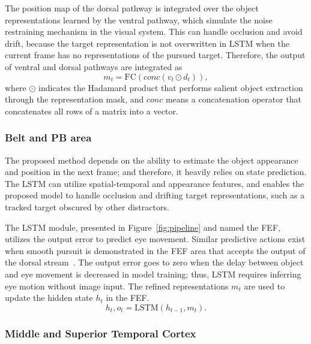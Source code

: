 \documentclass[journal]{IEEEtran}
\begin{document}
The position map of the dorsal pathway is integrated over the object representations learned by the ventral pathway, which simulate the noise restraining mechanism in the visual system. 
This can handle occlusion and avoid drift, because the target representation is not overwritten in LSTM when the current frame has no representations of the pursued target. 
Therefore, the output of ventral and dorsal pathways are integrated as
\begin{equation}
	m_t = \text{FC}(conc(v_t \odot d_t)),
\end{equation}
where $\odot$ indicates the Hadamard product that performs salient object extraction through the representation mask, 
and $conc$ means a concatenation operator that concatenates all rows of a matrix into a vector.

\subsubsection{Belt and PB area}

The proposed method depends on the ability to estimate the object appearance and position in the next frame; 
and therefore, it heavily relies on state prediction. 
The LSTM can utilize spatial-temporal and appearance features, 
and enables the proposed model to handle occlusion and drifting target representations, such as a tracked target obscured by other distractors. 

The LSTM module, presented in Figure~\ref{fig:pipeline} and named the FEF, utilizes the output error to predict eye movement. 
Similar predictive actions exist when smooth pursuit is demonstrated in the FEF area that accepts the output of the dorsal stream~\cite{b11,b13,b14}. 
The output error goes to zero when the delay between object and eye movement is decreased in model training; 
thus, LSTM requires inferring eye motion without image input.
The refined representations $m_t$ are used to update the hidden state $h_t$ in the FEF. 
\begin{equation} \label{LSTM}
	h_t, o_t = \text{LSTM}(h_{t-1}, m_t).
\end{equation}


\subsubsection{Middle and Superior Temporal Cortex}
\end{document}
